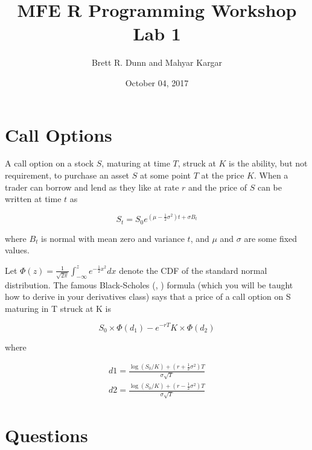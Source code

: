 \documentclass[12pt]{article}
\title{MFE R Programming Workshop Lab 1}
\date{October 04, 2017}
\author{Brett R. Dunn and Mahyar Kargar}
\begin{document}
\maketitle

\section{Call Options}
A call option on a stock $S$, maturing at time $T$, struck at $K$
is the ability, but not requirement, to purchase an asset $S$ at some
point $T$ at the price $K$. When a trader can borrow and lend as they like
at rate $r$ and the price of $S$ can be written at time $t$ as

\[
S_t = S_0 e^{\left(\mu-\frac{1}{2} \sigma^2 \right) t + \sigma B_t}
\]

where $B_t$ is normal with mean zero and variance $t$, and $\mu$ and
$\sigma$ are some fixed values.

Let $\Phi(z) = \frac{1}{\sqrt{2 \pi}} \int_{-\infty}^z e^{-\frac{1}{2}
  x^2}dx$ denote the CDF of the standard normal distribution. The
famous Black-Scholes (\cite{black1973pricing},
\cite{merton1973theory}) formula (which you will be taught how to
derive in your derivatives class) says that a price of a call option
on S maturing in T struck at K is

\[
S_0 \times \Phi(d_1) - e^{-rT} K \times \Phi(d_2)
\]

where

\begin{eqnarray*}
  d1 = \frac{\log(S_0 / K) + \left(r + \frac{1}{2} \sigma^2 \right)
    T}{\sigma \sqrt{T}} \\
  d2 = \frac{\log(S_0 / K) + \left(r - \frac{1}{2} \sigma^2 \right)
    T}{\sigma \sqrt{T}}
\end{eqnarray*}

\section{Questions}
\end{document}
